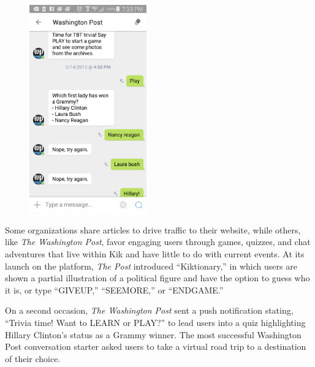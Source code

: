 \documentclass[notoc, symmetric, nobib, nols]{towcenter-guideto-book}
\begin{document}
\begin{figure}
\includegraphics[width=0.45\textwidth]{graphics/CHATAPPS_Page19_Kik2.png} 
\end{figure}

Some organizations share articles to drive traffic to their website, while others, like \textit{The Washington Post}, favor engaging users through games, quizzes, and chat adventures that live within Kik and have little to do with current events. At its launch on the platform, \textit{The Post} introduced ``Kiktionary,'' in which users are shown a partial illustration of a political figure and have the option to guess who it is, or type ``GIVEUP,'' ``SEEMORE,'' or ``ENDGAME.''  

On a second occasion, \textit{The Washington Post} sent a push notification stating, ``Trivia time! Want to LEARN or PLAY?'' to lead users into a quiz highlighting Hillary Clinton's status as a Grammy winner. The most successful Washington Post conversation starter asked users to take a virtual road trip to a destination of their choice.  



\end{document}
